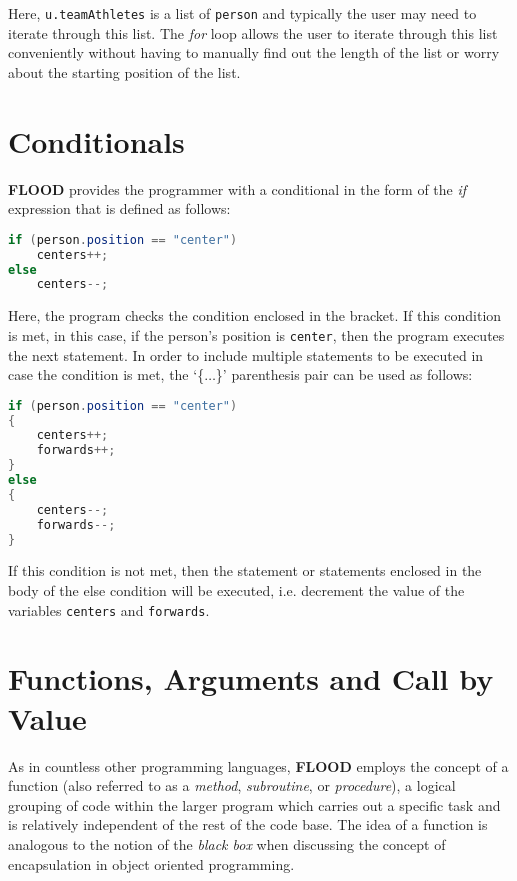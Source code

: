 \documentclass[12pt]{report}
\begin{document}
Here, \texttt{u.teamAthletes} is a list of \texttt{person} and typically the user may need to iterate through this list. The \textit{for} loop allows the user to iterate through this list conveniently without having to manually find out the length of the list or worry about the starting position of the list.

\section{Conditionals}

\textbf{FLOOD} provides the programmer with a conditional in the form of the \textit{if} expression that is defined as follows:

\begin{singlespace}
\begin{lstlisting}[language=Java,label=some-code,caption=if conditional]
if (person.position == "center")
	centers++;
else
	centers--;
\end{lstlisting}
\end{singlespace}

Here, the program checks the condition enclosed in the bracket. If this condition is met, in this case, if the person's position is \texttt{center}, then the program executes the next statement. In order to include multiple statements to be executed in case the condition is met, the `\{$\ldots$\}'
parenthesis pair can be used as follows:

\begin{singlespace}
\begin{lstlisting}[language=Java,label=some-code,caption=Bracketed conditionals]
if (person.position == "center")
{
	centers++;
	forwards++;
}
else
{
	centers--;
	forwards--;
}
\end{lstlisting}
\end{singlespace}

If this condition is not met, then the statement or statements enclosed in the body of the else condition will be executed, i.e. decrement the value of the variables \texttt{centers} and \texttt{forwards}.

\section{Functions, Arguments and Call by Value}

As in countless other programming languages, \textbf{FLOOD} employs the concept of a function (also referred to as a \textit{method}, \textit{subroutine}, or \textit{procedure}), a logical grouping of code within the larger program which carries out a specific task and is relatively independent of the rest of the code base. The idea of a function is analogous to the notion of the \textit{black box} when discussing the concept of encapsulation in object oriented programming. 
\end{document}
